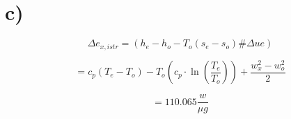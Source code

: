 

\section*{c)}

\[
\Delta e_{x,istr} = (h_{e} - h_{o} - T_{o}(s_{e} - s_{o}) \# \Delta u e)
\]

\[
= c_p (T_{e} - T_{o}) - T_{o} \left( c_p \cdot \ln \left( \frac{T_{e}}{T_{o}} \right) \right) + \frac{w_{x}^2 - w_{o}^2}{2}
\]

\[
= 110.065 \frac{w}{\mu g}
\]